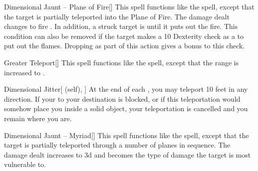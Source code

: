 \lowercase{\hypertarget{spell:Dimensional Jaunt -- Plane of Fire}{}}\label{spell:Dimensional Jaunt -- Plane of Fire}
\begin{freeability}[\nth{3}]{\hypertarget{spell:Dimensional Jaunt -- Plane of Fire}{Dimensional Jaunt -- Plane of Fire}}[]
This spell functions like the  spell, except that the target is partially teleported into the Plane of Fire.
The damage dealt changes to fire .
In addition, a struck target is  until it puts out the fire.
This condition can also be removed if the target makes a  10 Dexterity check as a  to put out the flames.
Dropping  as part of this action gives a  bonus to this check.
\end{freeability}
\vspace{0.25em}



\lowercase{\hypertarget{spell:Greater Teleport}{}}\label{spell:Greater Teleport}
\begin{freeability}[\nth{3}]{\hypertarget{spell:Greater Teleport}{Greater Teleport}}[]
This spell functions like the  spell, except that the range is increased to \rnglong.
\end{freeability}
\vspace{0.25em}



\lowercase{\hypertarget{spell:Dimensional Jitter}{}}\label{spell:Dimensional Jitter}
\begin{attuneability}[\nth{4}]{\hypertarget{spell:Dimensional Jitter}{Dimensional Jitter}}[ (self), ]
At the end of each , you may teleport 10 feet in any direction.
If your  to your destination is blocked, or if this teleportation would somehow place you inside a solid object, your teleportation is cancelled and you remain where you are.
\end{attuneability}
\vspace{0.25em}



\lowercase{\hypertarget{spell:Dimensional Jaunt -- Myriad}{}}\label{spell:Dimensional Jaunt -- Myriad}
\begin{freeability}[\nth{5}]{\hypertarget{spell:Dimensional Jaunt -- Myriad}{Dimensional Jaunt -- Myriad}}[]
This spell functions like the  spell, except that the target is partially teleported through a number of planes in sequence.
The damage dealt increases to  \plus3d and becomes the type of damage the target is most vulnerable to.
\end{freeability}
\vspace{0.25em}



